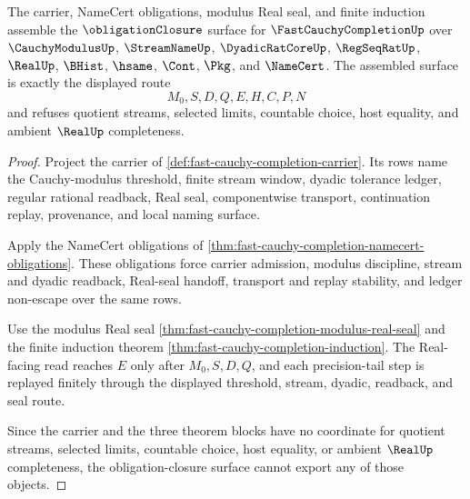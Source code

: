 \begin{theorem}
\label{thm:fast-cauchy-completion-obligation-closure-surface}
The carrier, NameCert obligations, modulus Real seal, and finite induction assemble the $\obligationClosure$ surface for $\FastCauchyCompletionUp$ over $\CauchyModulusUp$, $\StreamNameUp$, $\DyadicRatCoreUp$, $\RegSeqRatUp$, $\RealUp$, $\BHist$, $\hsame$, $\Cont$, $\Pkg$, and $\NameCert$. The assembled surface is exactly the displayed route
$$
M_0,S,D,Q,E,H,C,P,N
$$
and refuses quotient streams, selected limits, countable choice, host equality, and ambient $\RealUp$ completeness.
\end{theorem}
\begin{proof}
Project the carrier of \autoref{def:fast-cauchy-completion-carrier}. Its rows name the Cauchy-modulus threshold, finite stream window, dyadic tolerance ledger, regular rational readback, Real seal, componentwise transport, continuation replay, provenance, and local naming surface.

Apply the NameCert obligations of \autoref{thm:fast-cauchy-completion-namecert-obligations}. These obligations force carrier admission, modulus discipline, stream and dyadic readback, Real-seal handoff, transport and replay stability, and ledger non-escape over the same rows.

Use the modulus Real seal \autoref{thm:fast-cauchy-completion-modulus-real-seal} and the finite induction theorem \autoref{thm:fast-cauchy-completion-induction}. The Real-facing read reaches $E$ only after $M_0,S,D,Q$, and each precision-tail step is replayed finitely through the displayed threshold, stream, dyadic, readback, and seal route.

Since the carrier and the three theorem blocks have no coordinate for quotient streams, selected limits, countable choice, host equality, or ambient $\RealUp$ completeness, the obligation-closure surface cannot export any of those objects.
\end{proof}



